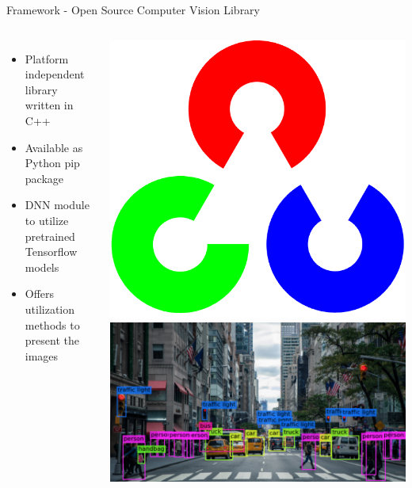 \documentclass{beamer}
\begin{document}
\begin{frame}{Framework - Open Source Computer Vision Library}
\begin{columns}
\begin{itemize}
\item Platform independent library written in C++
\item Available as Python pip package
\item DNN module to utilize pretrained Tensorflow models
\item Offers utilization methods to present the images
\end{itemize}
\hfill \includegraphics[scale=0.2]{sources/OpenCV_Logo_with_text.png}
\includegraphics[scale=0.2]{sources/18.png}
\end{columns}
\end{frame}
\end{document}
